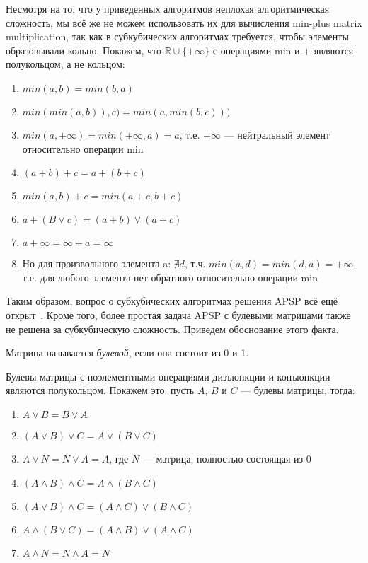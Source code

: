 Несмотря на то, что у приведенных алгоритмов неплохая алгоритмическая сложность, мы всё же не можем использовать их для вычисления min-plus matrix multiplication, так как в субкубических алгоритмах требуется, чтобы элементы образовывали кольцо. Покажем, что $\mathbb{R} \cup \{+\infty\}$ с операциями min и + являются полукольцом, а не кольцом:
\begin{enumerate}
    \item $min(a, b) = min(b, a)$
    \item $min(min(a, b)), c) = min(a, min(b, c)))$
    \item $min(a, +\infty) = min(+\infty, a) = a$, т.е. $+\infty$ --- нейтральный элемент относительно операции min

    \item $(a + b) + c = a + (b + c)$

    \item $min(a, b) + c = min(a + c, b + c)$
    \item $a + (B \vee c) = (a + b) \vee (a + c)$

    \item $a + \infty = \infty + a = \infty$
    \item Но для произвольного элемента a: $\nexists d$, т.ч. $min(a, d) = min(d, a) = +\infty$, т.е. для любого элемента нет обратного относительно операции min
\end{enumerate}

Таким образом, вопрос о субкубических алгоритмах решения APSP всё ещё открыт~\cite{Chan2010}.
Кроме того, более простая задача APSP с булевыми матрицами также не решена за субкубическую сложность. Приведем обоснование этого факта.

\begin{definition}
  Матрица называется \textit{булевой}, если она состоит из 0 и 1.
\end{definition}

Булевы матрицы с поэлементными операциями дизъюнкции и конъюнкции являются полукольцом. Покажем это: пусть $A$, $B$ и $C$ --- булевы матрицы, тогда:
\begin{enumerate}
    \item $A \vee B = B \vee A$
    \item $(A \vee B) \vee C = A \vee (B \vee C)$
    \item $A \vee N = N \vee A = A$, где $N$ --- матрица, полностью состоящая из 0

    \item $(A \wedge B) \wedge C = A \wedge (B \wedge C)$

    \item $(A \vee B) \wedge C = (A \wedge C) \vee (B \wedge C)$
    \item $A \wedge (B \vee C) = (A \wedge B) \vee (A \wedge C)$

    \item $A \wedge N = N \wedge A = N$
\end{enumerate}

